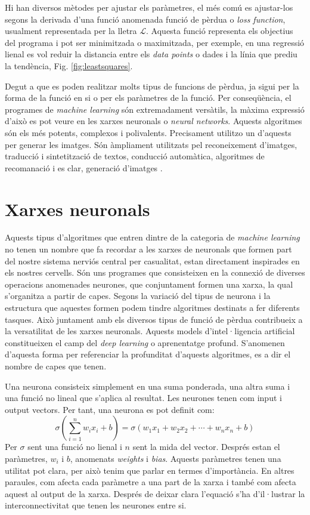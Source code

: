 Hi han diversos mètodes per ajustar els paràmetres, el més comú es ajustar-los segons la derivada d'una funció anomenada funció de pèrdua o \textit{loss function}, usualment representada per la lletra $\mathcal{L}$. Aquesta funció representa els objectius del programa i pot ser minimitzada o maximitzada, per exemple, en una regressió lienal es vol reduir la distancia entre els \textit{data points} o dades i la línia que prediu la tendència, Fig. \ref{fig:leastsquares}. 

Degut a que es poden realitzar molts tipus de funcions de pèrdua, ja sigui per la forma de la funció en si o per els paràmetres de la funció. Per conseqüència, el programes de \textit{machine learning} són extremadament versàtils, la màxima expressió d'això es pot veure en les xarxes neuronals o \textit{neural networks}. Aquests algoritmes són els més potents, complexos i polivalents. Precisament utilitzo un d'aquests per generar les imatges. Són àmpliament utilitzats pel reconeixement d'imatges, traducció i sintetització de textos, conducció automàtica, algoritmes de recomanació i es clar, generació d'imatges \tocite. 

\section{Xarxes neuronals}
Aquests tipus d'algoritmes que entren dintre de la categoria de \textit{machine learning} no tenen un nombre que fa recordar a les xarxes de neuronals que formen part del nostre sistema nerviós central per casualitat, estan directament inspirades en els nostres cervells. Són uns programes que consisteixen en la connexió de diverses operacions anomenades neurones, que conjuntament formen una xarxa, la qual s'organitza a partir de capes. Segons la variació del tipus de neurona i la estructura que aquestes formen podem tindre algoritmes destinats a fer diferents tasques. Això juntament amb els diversos tipus de funció de pèrdua contribueix a la versatilitat de les xarxes neuronals. Aquests models d'intel·ligencia artificial constitueixen el camp del \textit{deep learning} o aprenentatge profund. S'anomenen d'aquesta forma per referenciar la profunditat d'aquests algoritmes, es a dir el nombre de capes que tenen.

Una neurona consisteix simplement en una suma ponderada, una altra suma i una funció no lineal que s'aplica al resultat. Les neurones tenen com input i output vectors. Per tant, una neurona es pot definit com:
$$
\sigma \left(\sum_{i=1}^n w_i x_i + b\right) = \sigma \left( w_1x_1 + w_2x_2 + \cdots + w_nx_n + b 
\right) 
$$
Per $\sigma$ sent una funció no lienal i $n$ sent la mida del vector. Després estan el paràmetres, $w_i$ i $b$, anomenats \textit{weights} i \textit{bias}. 
Aquests paràmetres tenen una utilitat pot clara, per això tenim que parlar en termes d'importància. En altres paraules, com afecta cada paràmetre a una part de la xarxa i també com afecta aquest al output de la xarxa. Després de deixar clara l'equació s'ha d'il·lustrar la interconnectivitat que tenen les neurones entre si. 

